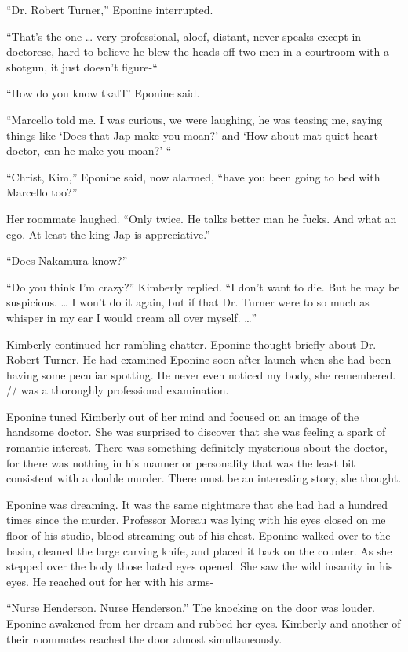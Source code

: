 \documentclass[]{article}
\begin{document}
{“Dr. Robert Turner,” Eponine interrupted.

“That’s the one … very professional, aloof, distant, never speaks except in doctorese, hard to believe he blew the heads off two men in a courtroom with a shotgun, it just doesn’t figure-“

“How do you know tkalT’ Eponine said.

“Marcello told me. I was curious, we were laughing, he was teasing me, saying things like ‘Does that Jap make you moan?’ and ‘How about mat quiet heart doctor, can he make you moan?’ “

“Christ, Kim,” Eponine said, now alarmed, “have you been going to bed with Marcello too?”

Her roommate laughed. “Only twice. He talks better man he fucks. And what an ego. At least the king Jap is appreciative.”

“Does Nakamura know?”

“Do you think I’m crazy?” Kimberly replied. “I don’t want to die. But he may be suspicious. … I won’t do it again, but if that Dr. Turner were to so much as whisper in my ear I would cream all over myself. …”

Kimberly continued her rambling chatter. Eponine thought briefly about Dr. Robert Turner. He had examined Eponine soon after launch when she had been having some peculiar spotting. He never even noticed my body, she remembered. // was a thoroughly professional examination.

Eponine tuned Kimberly out of her mind and focused on an image of the handsome doctor. She was surprised to discover that she was feeling a spark of romantic interest. There was something definitely mysterious about the doctor, for there was nothing in his manner or personality that was the least bit consistent with a double murder. There must be an interesting story, she thought.

Eponine was dreaming. It was the same nightmare that she had had a hundred times since the murder. Professor Moreau was lying with his eyes closed on me floor of his studio, blood streaming out of his chest. Eponine walked over to the basin, cleaned the large carving knife, and placed it back on the counter. As she stepped over the body those hated eyes opened. She saw the wild insanity in his eyes. He reached out for her with his arms-

“Nurse Henderson. Nurse Henderson.” The knocking on the door was louder. Eponine awakened from her dream and rubbed her eyes. Kimberly and another of their roommates reached the door almost simultaneously.

}
\end{document}

